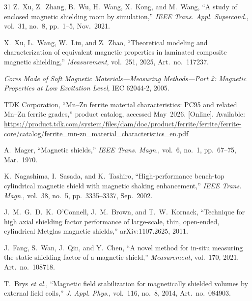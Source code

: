 ﻿\documentclass[letterpaper,journal]{IEEEtran}
\begin{document}
\begin{thebibliography}{31}
Z.~Xu, Z.~Zhang, B.~Wu, H.~Wang, X.~Kong, and M.~Wang,
``A study of enclosed magnetic shielding room by simulation,''
\textit{IEEE Trans. Appl. Supercond.}, vol.~31, no.~8, pp.~1--5, Nov.~2021.

X.~Xu, L.~Wang, W.~Liu, and Z.~Zhao,
``Theoretical modeling and characterization of equivalent magnetic properties in laminated composite magnetic shielding,''
\textit{Measurement}, vol.~251, 2025, Art.~no.~117237.

\textit{Cores Made of Soft Magnetic Materials---Measuring Methods---Part 2: Magnetic Properties at Low Excitation Level}, IEC 62044-2, 2005.

TDK Corporation,
``Mn--Zn ferrite material characteristics: PC95 and related Mn--Zn ferrite grades,''
product catalog, accessed May~2026. [Online]. Available: \url{https://product.tdk.com/system/files/dam/doc/product/ferrite/ferrite/ferrite-core/catalog/ferrite_mn-zn_material_characteristics_en.pdf}

A.~Mager,
``Magnetic shields,''
\textit{IEEE Trans. Magn.}, vol.~6, no.~1, pp.~67--75, Mar.~1970.

K.~Nagashima, I.~Sasada, and K.~Tashiro,
``High-performance bench-top cylindrical magnetic shield with magnetic shaking enhancement,''
\textit{IEEE Trans. Magn.}, vol.~38, no.~5, pp.~3335--3337, Sep.~2002.

J.~M.~G.~D.~K.~O'Connell, J.~M.~Brown, and T.~W.~Kornack,
``Technique for high axial shielding factor performance of large-scale, thin, open-ended, cylindrical Metglas magnetic shields,''
arXiv:1107.2625, 2011.

J.~Fang, S.~Wan, J.~Qin, and Y.~Chen,
``A novel method for in-situ measuring the static shielding factor of a magnetic shield,''
\textit{Measurement}, vol.~170, 2021, Art.~no.~108718.

T.~Brys \textit{et al.},
``Magnetic field stabilization for magnetically shielded volumes by external field coils,''
\textit{J. Appl. Phys.}, vol.~116, no.~8, 2014, Art.~no.~084903.

\end{thebibliography}
\end{document}
